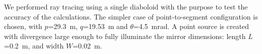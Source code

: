 \documentclass{iucr}              %
\begin{document}


We performed ray tracing using a single diaboloid with the purpose to test the accuracy of the calculations. The simpler case of point-to-segment configuration is chosen, with $p$=29.3~m, $q$=19.53~m and $\theta$=4.5~mrad. A point source is created with divergence large enough to fully illuminate the mirror dimensions: length $L$=0.2~m, and width $W$=0.02~m.
\end{document}
